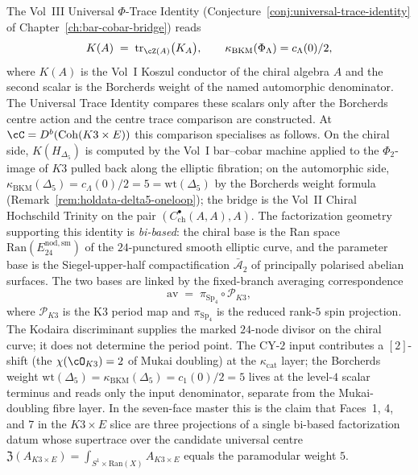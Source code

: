 \begin{remark}
\label{rem:holdata-universal-phi-trace}
The Vol~III Universal $\Phi$-Trace Identity
(Conjecture~\ref{conj:universal-trace-identity} of
Chapter~\ref{ch:bar-cobar-bridge}) reads
\[
 K(A) \;=\; \mathrm{tr}_{\cZ(A)}\bigl(K_A\bigr),
 \qquad
 \kappa_{\mathrm{BKM}}(\Phi_\Lambda)=c_\Lambda(0)/2,
\]
where $K(A)$ is the Vol~I Koszul conductor of the chiral algebra $A$ and
the second scalar is the Borcherds weight of the named automorphic
denominator.  The Universal Trace Identity compares these scalars only
after the Borcherds centre action and the centre trace comparison are
constructed. At $\cC = D^b(\mathrm{Coh}(K3 \times E))$ this comparison
specialises as follows. On the chiral side, $K(H_{\Delta_5})$ is computed by the
Vol~I bar--cobar machine applied to the $\Phi_2$-image of $K3$ pulled
back along the elliptic fibration; on the automorphic side,
$\kappa_{\mathrm{BKM}}(\Delta_5) = c_\Lambda(0)/2 = 5 =
\mathrm{wt}(\Delta_5)$ by the Borcherds weight formula
(Remark~\ref{rem:holdata-delta5-oneloop}); the bridge is the Vol~II
Chiral Hochschild Trinity on the pair
$(C^\bullet_{\mathrm{ch}}(A, A), A)$. The factorization geometry
supporting this identity is \emph{bi-based}: the chiral base is the
Ran space $\mathrm{Ran}(E_{24}^{\mathrm{nod,sm}})$ of the $24$-punctured
smooth elliptic curve, and the parameter base is the Siegel-upper-half
compactification $\bar{\mathcal{A}}_2$ of principally polarised abelian
surfaces. The two bases are linked by the fixed-branch averaging correspondence
\[
 \mathrm{av} \;=\; \pi_{\mathrm{Sp}_4}\circ\mathscr P_{K3},
\]
where \(\mathscr P_{K3}\) is the K3 period map and \(\pi_{\mathrm{Sp}_4}\) is the reduced rank-\(5\) spin projection. The Kodaira discriminant supplies the marked \(24\)-node divisor on the chiral curve; it does not determine the period point. The CY-$2$ input contributes
a $[2]$-shift (the $\chi(\cO_{K3}) = 2$ of Mukai doubling) at the
$\kappa_{\mathrm{cat}}$ layer; the Borcherds weight
$\mathrm{wt}(\Delta_5) = \kappa_{\mathrm{BKM}}(\Delta_5) = c_1(0)/2 = 5$
lives at the level-$4$ scalar terminus and reads only the input
denominator, separate from the Mukai-doubling fibre layer. In the
seven-face master this is the claim that Faces~1, 4, and 7 in the
$K3 \times E$ slice are three projections of a single bi-based
factorization datum whose supertrace over the candidate universal centre
$\mathfrak{Z}(A_{K3 \times E}) = \int_{S^1 \times \mathrm{Ran}(X)} A_{K3 \times E}$
equals the paramodular weight $5$.
\end{remark}

